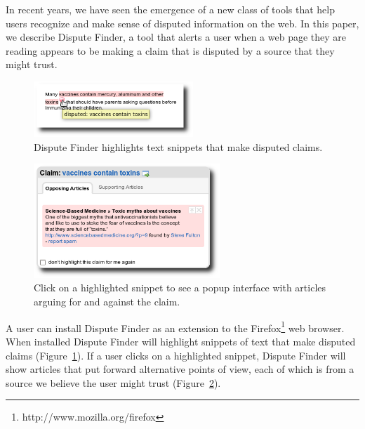 \documentclass{www2010-submission}
\newcommand{\todo}[1]{}
\begin{document}
In recent years, we have seen the emergence of a new class of tools that help users recognize and make sense of disputed information on the web. In this paper, we describe Dispute Finder, a tool that alerts a user when a web page they are reading appears to be making a claim that is disputed by a source that they might trust.

\begin{figure}[tb]
	\begin{center}
	\includegraphics[width=6cm]{pictures/highlight_vaccine_shadow.png}
	\caption{Dispute Finder highlights text snippets that make disputed claims.}
	\label{highlight}
	\end{center}
\end{figure}

\begin{figure}[tb]
	\begin{center}
	\includegraphics[width=7cm]{pictures/popup_vaccine_shadow.png}
	\caption{Click on a highlighted snippet to see a popup interface with articles arguing for and against the claim.}
	\label{claimview}
	\end{center}
\end{figure}
\todo{Popup interface should contain a ``don't mark this'' button}

\todo{More screenshots/graphs/visual information}

\todo{word this better}\todo{update all screenshots}


A user can install Dispute Finder as an extension to the Firefox\footnote{http://www.mozilla.org/firefox} web browser. When installed Dispute Finder will highlight snippets of text that make disputed claims (Figure~\ref{highlight}). 
If a user clicks on a highlighted snippet, Dispute Finder will show articles that put forward alternative points of view,  each of which is from a source we believe the user might trust (Figure~\ref{claimview}). 
\end{document}
